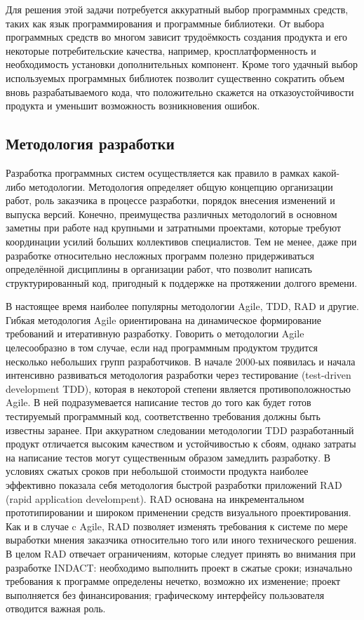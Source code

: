 \documentclass[12pt]{diploma}
\begin{document}
	Для решения этой задачи потребуется аккуратный выбор программных средств, таких как язык программирования и программные библиотеки. От выбора программных средств во многом зависит трудоёмкость создания продукта и его некоторые потребительские качества, например, кросплатформенность и необходимость установки дополнительных компонент. Кроме того удачный выбор используемых программных библиотек позволит существенно сократить объем вновь разрабатываемого кода, что положительно скажется на отказоустойчивости продукта и уменьшит  возможность возникновения ошибок. 
	
	\subsection{Методология разработки}
	Разработка программных систем осуществляется как правило в рамках какой-либо методологии. Методология определяет общую концепцию организации работ, роль заказчика в процессе разработки, порядок внесения изменений и выпуска версий. Конечно, преимущества различных методологий в основном заметны при работе над крупными и затратными проектами, которые требуют координации усилий больших коллективов специалистов. Тем не менее, даже при разработке относительно несложных программ полезно придерживаться определённой дисциплины в организации работ, что позволит написать структурированный код, пригодный к поддержке на протяжении долгого времени.
	
	В настоящее время наиболее популярны методологии Agile, TDD, RAD и другие. Гибкая методология Agile ориентирована на динамическое формирование требований и итеративную разработку. Говорить о методологии  Agile целесообразно в том случае, если над программным продуктом трудится несколько небольших групп разработчиков. В начале 2000-ых появилась и начала интенсивно развиваться методология разработки через тестирование (test-driven development TDD), которая в некоторой степени является противоположностью Agile. В ней подразумевается написание тестов до того как будет готов тестируемый программный код, соответственно требования должны быть известны заранее. При аккуратном следовании методологии TDD разработанный продукт отличается высоким качеством и устойчивостью к сбоям, однако затраты на написание тестов могут существенным образом замедлить разработку. В условиях сжатых сроков при небольшой стоимости продукта наиболее эффективно показала себя методология быстрой разработки приложений RAD (rapid application develompent). RAD основана на инкрементальном прототипировании и широком применении средств визуального проектирования. Как и в случае c Agile, RAD позволяет изменять требования к системе по мере выработки мнения заказчика относительно того или иного технического решения. В целом RAD отвечает ограничениям, которые следует принять во внимания при разработке INDACT: необходимо выполнить проект в сжатые сроки; изначально требования к программе определены  нечетко, возможно их изменение; проект выполняется без финансирования; графическому интерфейсу пользователя отводится важная роль.
\end{document}
